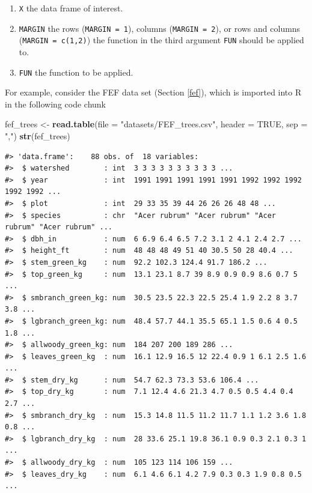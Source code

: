 \documentclass[
  11pt,
]{krantz}
\newenvironment{Shaded}{\begin{snugshade}}{\end{snugshade}}
\newcommand{\DataTypeTok}[1]{\textcolor[rgb]{0.13,0.29,0.53}{#1}}
\newcommand{\KeywordTok}[1]{\textcolor[rgb]{0.13,0.29,0.53}{\textbf{#1}}}
\newcommand{\NormalTok}[1]{#1}
\newcommand{\OtherTok}[1]{\textcolor[rgb]{0.56,0.35,0.01}{#1}}
\newcommand{\StringTok}[1]{\textcolor[rgb]{0.31,0.60,0.02}{#1}}
\providecommand{\tightlist}{%
  \setlength{\itemsep}{0pt}\setlength{\parskip}{0pt}}
\theoremstyle{definition}
\theoremstyle{definition}
\theoremstyle{definition}
\theoremstyle{definition}
\theoremstyle{remark}
\begin{document}
\begin{enumerate}
\def\labelenumi{\arabic{enumi}.}
\tightlist
\item
  \texttt{X} the data frame of interest.
\item
  \texttt{MARGIN} the rows (\texttt{MARGIN\ =\ 1}), columns (\texttt{MARGIN\ =\ 2}), or rows and columns (\texttt{MARGIN\ =\ c(1,2)}) the function in the third argument \texttt{FUN} should be applied to.
\item
  \texttt{FUN} the function to be applied.
\end{enumerate}

For example, consider the FEF data set (Section \ref{fef}), which is imported into R in the following code chunk

\begin{Shaded}
\begin{Highlighting}[]
\NormalTok{fef\_trees \textless{}{-}}\StringTok{ }\KeywordTok{read.table}\NormalTok{(}\DataTypeTok{file =} \StringTok{"datasets/FEF\_trees.csv"}\NormalTok{,}
            \DataTypeTok{header =} \OtherTok{TRUE}\NormalTok{, }\DataTypeTok{sep =} \StringTok{","}\NormalTok{)}
\KeywordTok{str}\NormalTok{(fef\_trees)}
\end{Highlighting}
\end{Shaded}

\begin{verbatim}
#> 'data.frame':    88 obs. of  18 variables:
#>  $ watershed        : int  3 3 3 3 3 3 3 3 3 3 ...
#>  $ year             : int  1991 1991 1991 1991 1991 1992 1992 1992 1992 1992 ...
#>  $ plot             : int  29 33 35 39 44 26 26 26 48 48 ...
#>  $ species          : chr  "Acer rubrum" "Acer rubrum" "Acer rubrum" "Acer rubrum" ...
#>  $ dbh_in           : num  6 6.9 6.4 6.5 7.2 3.1 2 4.1 2.4 2.7 ...
#>  $ height_ft        : num  48 48 48 49 51 40 30.5 50 28 40.4 ...
#>  $ stem_green_kg    : num  92.2 102.3 124.4 91.7 186.2 ...
#>  $ top_green_kg     : num  13.1 23.1 8.7 39 8.9 0.9 0.9 8.6 0.7 5 ...
#>  $ smbranch_green_kg: num  30.5 23.5 22.3 22.5 25.4 1.9 2.2 8 3.7 3.8 ...
#>  $ lgbranch_green_kg: num  48.4 57.7 44.1 35.5 65.1 1.5 0.6 4 0.5 1.8 ...
#>  $ allwoody_green_kg: num  184 207 200 189 286 ...
#>  $ leaves_green_kg  : num  16.1 12.9 16.5 12 22.4 0.9 1 6.1 2.5 1.6 ...
#>  $ stem_dry_kg      : num  54.7 62.3 73.3 53.6 106.4 ...
#>  $ top_dry_kg       : num  7.1 12.4 4.6 21.3 4.7 0.5 0.5 4.4 0.4 2.7 ...
#>  $ smbranch_dry_kg  : num  15.3 14.8 11.5 11.2 11.7 1.1 1.2 3.6 1.8 0.8 ...
#>  $ lgbranch_dry_kg  : num  28 33.6 25.1 19.8 36.1 0.9 0.3 2.1 0.3 1 ...
#>  $ allwoody_dry_kg  : num  105 123 114 106 159 ...
#>  $ leaves_dry_kg    : num  6.1 4.6 6.1 4.2 7.9 0.3 0.3 1.9 0.8 0.5 ...
\end{verbatim}
\end{document}
